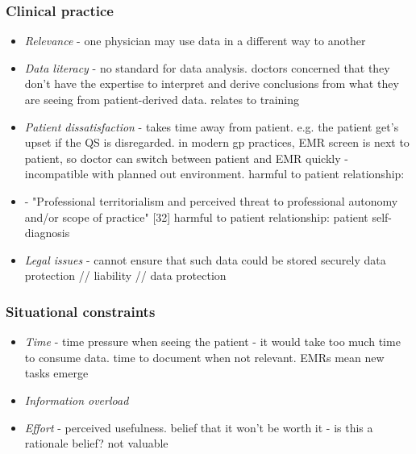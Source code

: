 \documentclass{sigchi}
\begin{document}
\subsubsection{Clinical practice}

\begin{itemize}
\item \textit{Relevance} - one physician may use data in a different way to another
\item \textit{Data literacy} - no standard for data analysis. doctors concerned that they don't have the expertise to interpret and derive conclusions from what they are seeing from patient-derived data. relates to training
\item \textit{Patient dissatisfaction} - takes time away from patient. e.g. the patient get's upset if the QS is disregarded. in modern gp practices, EMR screen is next to patient, so doctor can switch between patient and EMR quickly - incompatible with planned out environment. harmful to patient relationship: 
\item {} - "Professional territorialism and perceived threat to professional autonomy and/or scope of practice" [32] harmful to patient relationship: patient self-diagnosis
\item \textit{Legal issues} - cannot ensure that such data could be stored securely data protection // liability // data protection
\end{itemize}

\subsubsection{Situational constraints}

\begin{itemize}
\item \textit{Time} - time pressure when seeing the patient - it would take too much time to consume data. time to document when not relevant. EMRs mean new tasks emerge
\item \textit{Information overload}
\item \textit{Effort} - perceived usefulness. belief that it won't be worth it - is this a rationale belief? not valuable
\end{itemize}


\end{document}
